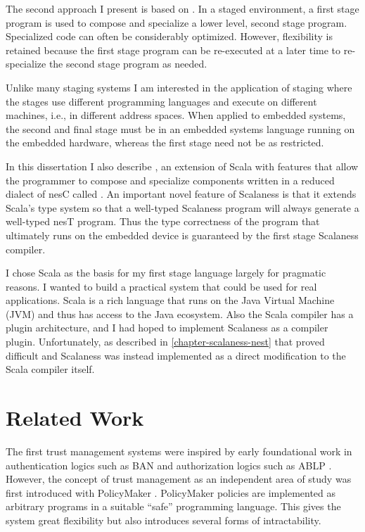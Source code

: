The second approach I present is based on 
\cite{Taha-MetaML,Sheard-TemplateHaskell,Mainland-Flask-2008,FramedML}. In a staged environment,
a first stage program is used to compose and specialize a lower level, second stage program.
Specialized code can often be considerably optimized. However, flexibility is retained because
the first stage program can be re-executed at a later time to re-specialize the second stage
program as needed.

Unlike many staging systems I am interested in the application of staging where the stages use
different programming languages and execute on different machines, i.e., in different address
spaces. When applied to embedded systems, the second and final stage must be in an embedded
systems language running on the embedded hardware, whereas the first stage need not be as
restricted.

In this dissertation I also describe  \cite{chapin-GPCE-2013}, an extension
of Scala \cite{PiS2} with features that allow the programmer to compose and specialize
components written in a reduced dialect of nesC called . An important novel
feature of Scalaness is that it extends Scala's type system so that a well-typed Scalaness
program will always generate a well-typed nesT program. Thus the type correctness of the program
that ultimately runs on the embedded device is guaranteed by the first stage Scalaness compiler.

I chose Scala as the basis for my first stage language largely for pragmatic reasons. I wanted
to build a practical system that could be used for real applications. Scala is a rich language
that runs on the Java Virtual Machine (JVM) and thus has access to the Java ecosystem. Also the
Scala compiler has a plugin architecture, and I had hoped to implement Scalaness as a compiler
plugin. Unfortunately, as described in \autoref{chapter-scalaness-nest} that proved difficult
and Scalaness was instead implemented as a direct modification to the Scala compiler itself.

\section{Related Work}


The first trust management systems were inspired by early foundational work in authentication
logics such as BAN \cite{Burrows:LA} and authorization logics such as ABLP \cite{Abadi:CACDS}.
However, the concept of trust management as an independent area of study was first introduced
with PolicyMaker \cite{Blaze:DTM,Blaze:CCPTMS}. PolicyMaker policies are implemented as
arbitrary programs in a suitable ``safe'' programming language. This gives the system great
flexibility but also introduces several forms of intractability.

